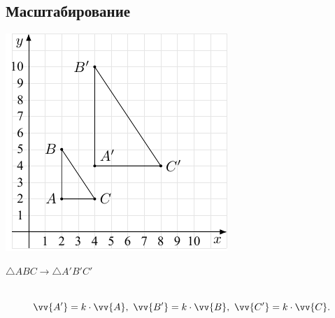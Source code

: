 \documentclass[10pt]{beamer}
\begin{document}
    \subsection{Масштабирование}
    
    {
    	{
    		\centering
    		\includegraphics[]{scale.pdf}
    		
    		
    	}
    	{
    		$\triangle ABC \rightarrow \triangle A'B'C' $ \\~\\
    		
   		   		
    		\pause
    		
    		$$\vv{A'}=k\cdot\vv{A}, \ \vv{B'}=k\cdot\vv{B}, \ \vv{C'}=k\cdot\vv{C}.$$
    		
    		
    		
    	}
    	
    }
    
\end{document}
